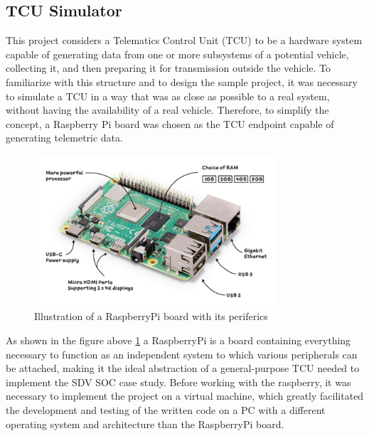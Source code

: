 \subsection{TCU Simulator}
This project considers a Telematics Control Unit (TCU) to be a hardware system capable of generating data from one or more subsystems of a potential vehicle, collecting it, and then preparing it for transmission outside the vehicle. To familiarize with this structure and to design the sample project, it was necessary to simulate a TCU in a way that was as close as possible to a real system, without having the availability of a real vehicle. Therefore, to simplify the concept, a Raspberry Pi board was chosen as the TCU endpoint capable of generating telemetric data.

\begin{figure}[h]  %
    \centering
    \includegraphics[width=0.8\textwidth]{images/raspberrypi.png}  %
    \caption{Illustration of a RaspberryPi board with its periferics \cite{raspberrypi}}
    \label{fig:raspberrypi}
\end{figure}

As shown in the figure above \ref{fig:raspberrypi} a RaspberryPi is a board containing everything necessary to function as an independent system to which various peripherals can be attached, making it the ideal abstraction of a general-purpose TCU needed to implement the SDV SOC case study.
Before working with the raspberry, it was necessary to implement the project on a virtual machine, which greatly facilitated the development and testing of the written code on a PC with a different operating system and architecture than the RaspberryPi board.

